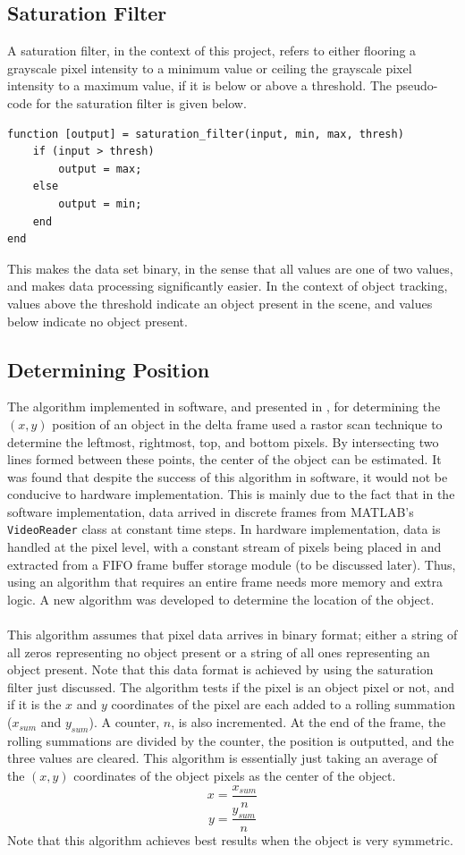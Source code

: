 \documentclass[11pt]{article} %
\begin{document}
\subsection{Saturation Filter}
A saturation filter, in the context of this project, refers to either flooring a grayscale pixel intensity to a minimum value or ceiling the grayscale pixel intensity to a maximum value, if it is below or above a threshold. The pseudo-code for the saturation filter is given below.
\begin{lstlisting}
function [output] = saturation_filter(input, min, max, thresh)
	if (input > thresh)
		output = max;
	else
		output = min;
	end
end
\end{lstlisting} 
This makes the data set binary, in the sense that all values are one of two values, and makes data processing significantly easier. In the context of object tracking, values above the threshold indicate an object present in the scene, and values below indicate no object present.
\subsection{Determining Position}
The algorithm implemented in software, and presented in \cite{phase1}, for determining the $(x,y)$ position of an object in the delta frame used a rastor scan technique to determine the leftmost, rightmost, top, and bottom pixels. By intersecting two lines formed between these points, the center of the object can be estimated. It was found that despite the success of this algorithm in software, it would not be conducive to hardware implementation. This is mainly due to the fact that in the software implementation, data arrived in discrete frames from MATLAB's \texttt{VideoReader} class at constant time steps. In hardware implementation, data is handled at the pixel level, with a constant stream of pixels being placed in and extracted from a FIFO frame buffer storage module (to be discussed later). Thus, using an algorithm that requires an entire frame needs more memory and extra logic. A new algorithm was developed to determine the location of the object. \\\\
This algorithm assumes that pixel data arrives in binary format; either a string of all zeros representing no object present or a string of all ones representing an object present. Note that this data format is achieved by using the saturation filter just discussed. The algorithm tests if the pixel is an object pixel or not, and if it is the $x$ and $y$ coordinates of the pixel are each added to a rolling summation ($x_{sum}$ and $y_{sum}$). A counter, $n$, is also incremented. At the end of the frame, the rolling summations are divided by the counter, the position is outputted, and the three values are cleared. This algorithm is essentially just taking an average of the $(x,y)$ coordinates of the object pixels as the center of the object.
\begin{equation}
\label{eq:x}
x = \frac{x_{sum}}{n}
\end{equation} 
\begin{equation}
\label{eq:y}
y = \frac{y_{sum}}{n}
\end{equation} 
Note that this algorithm achieves best results when the object is very symmetric.
\end{document}
